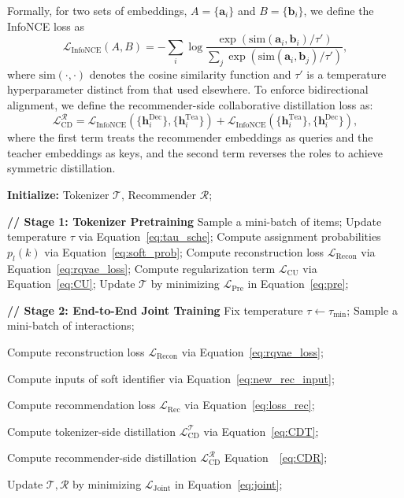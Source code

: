 Formally, for two sets of embeddings, $A = \{\bm{a}_i\}$ and $B = \{\bm{b}_i\}$, we define the InfoNCE loss as
\begin{equation}
\mathcal{L}_\text{InfoNCE}(A, B) 
= - \sum_{i} \log \frac{\exp(\text{sim}(\bm{a}_i, \bm{b}_i) / \tau')}
{\sum_{j} \exp(\text{sim}(\bm{a}_i, \bm{b}_j) / \tau')},
\end{equation}
where $\text{sim}(\cdot, \cdot)$ denotes the cosine similarity function and $\tau'$ is a temperature hyperparameter distinct from that used elsewhere.
To enforce bidirectional alignment, we define the recommender-side collaborative distillation loss as:
\begin{equation}\label{eq:CDR}
\mathcal{L}_\text{CD}^\mathcal{R} =
\mathcal{L}_\text{InfoNCE}(\{\bm{h}_i^\text{Dec}\}, \{\bm{h}_i^\text{Tea}\})
+ \mathcal{L}_\text{InfoNCE}(\{\bm{h}_i^\text{Tea}\}, \{\bm{h}_i^\text{Dec}\}),
\end{equation}
where the first term treats the recommender embeddings as queries and the teacher embeddings as keys, and the second term reverses the roles to achieve symmetric distillation.


\begin{algorithm}[t]
\caption{Training Pipeline of UniGRec}
\label{alg:training}
\begin{algorithmic}[1]

\State \textbf{Initialize:} Tokenizer $\mathcal{T}$, Recommender $\mathcal{R}$;

\State \textbf{// Stage 1: Tokenizer Pretraining}
    \State Sample a mini-batch of items;
    \State Update temperature $\tau$ via Equation~\eqref{eq:tau_sche};
    \State Compute assignment probabilities $p_l(k)$ via Equation~\eqref{eq:soft_prob};
    \State Compute reconstruction loss $\mathcal{L}_\text{Recon}$ 
    via Equation~\eqref{eq:rqvae_loss};
    \State Compute regularization term $\mathcal{L}_\text{CU}$ via Equation~\eqref{eq:CU};
    \State Update $\mathcal{T}$ by minimizing $\mathcal{L}_\text{Pre}$ in Equation~\eqref{eq:pre};
\EndWhile


\State \textbf{// Stage 2: End-to-End Joint Training}
\State Fix temperature $\tau \gets \tau_{\min}$;
    \State Sample a mini-batch of interactions;

    \State Compute reconstruction loss $\mathcal{L}_\text{Recon}$ 
    via Equation~\eqref{eq:rqvae_loss};

    \State Compute inputs of soft identifier via Equation~\eqref{eq:new_rec_input};

    \State Compute recommendation loss $\mathcal{L}_\text{Rec}$ via Equation~\eqref{eq:loss_rec};

    \State Compute tokenizer-side distillation $\mathcal{L}_\text{CD}^\mathcal{T}$ via Equation~\eqref{eq:CDT};
    
    \State Compute recommender-side distillation $\mathcal{L}_\text{CD}^\mathcal{R}$ Equation~~\eqref{eq:CDR};

    \State Update $\mathcal{T}, \mathcal{R}$ by minimizing $\mathcal{L}_\text{Joint}$ in Equation~\eqref{eq:joint};
\EndWhile

\end{algorithmic}
\end{algorithm}

